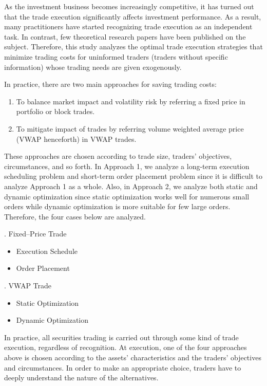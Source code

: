 \documentclass[a4paper,openany]{book}
\begin{document}

\vspace*{1cm}

\noindent As the investment business becomes increasingly competitive, it has turned out that the trade execution significantly affects investment performance.  As a result, many practitioners have started recognizing trade execution as an independent task.  In contrast, few theoretical research papers have been published on the subject.  Therefore, this study analyzes the optimal trade execution strategies that minimize trading costs for uninformed traders (traders without specific information) whose trading needs are given exogenously.

In practice, there are two main approaches for saving trading costs: 
\begin{enumerate}
\item To balance market impact and volatility risk by referring a fixed price in portfolio or block trades.
\item To mitigate impact of trades by referring volume weighted average price (VWAP henceforth) in VWAP trades.  
\end{enumerate}
These approaches are chosen according to trade size, traders' objectives, circumstances, and so forth.  In Approach 1, we analyze a long-term execution scheduling problem and short-term order placement problem since it is difficult to analyze Approach 1 as a whole.  Also, in Approach 2, we analyze both static and dynamic optimization since static optimization works well for numerous small orders while dynamic optimization is more suitable for few large orders.  Therefore, the four cases below are analyzed.


\bigskip

. Fixed--Price Trade
\begin{itemize}
\item Execution Schedule
\item Order Placement
\end{itemize}
. VWAP Trade
\begin{itemize}
\item Static Optimization
\item Dynamic Optimization
\end{itemize}

\bigskip

In practice, all securities trading is carried out through some kind of trade execution, regardless of recognition.  At execution, one of the four approaches above is chosen according to the assets' characteristics and the traders' objectives and circumstances.  In order to make an appropriate choice, traders have to deeply understand the nature of the alternatives.  
\end{document}
